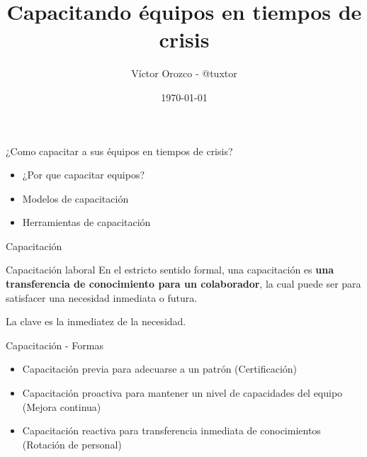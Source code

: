 \documentclass[aspectratio=169]{beamer}
\title{Capacitando équipos en tiempos de crisis}
\author{Víctor Orozco - @tuxtor}
\institute{Academik}
\date{\today}
\begin{document}
{
    \frame{\titlepage}
}

\begin{frame}[fragile]{¿Como capacitar a sus équipos en tiempos de crisis?}
	\begin{itemize}
		\item ¿Por que capacitar equipos?
		\item Modelos de capacitación
		\item Herramientas de capacitación
	\end{itemize}	
\end{frame}

\begin{frame}[fragile]{Capacitación}
    
    \begin{exampleblock}{Capacitación laboral}
        En el estricto sentido formal, una capacitación es \textbf{una transferencia de conocimiento para un colaborador}, la cual puede ser para satisfacer una necesidad inmediata o futura.
        
        La clave es la inmediatez de la necesidad.
    \end{exampleblock}
    
    

\end{frame}

\begin{frame}[fragile]{Capacitación - Formas}
    \begin{itemize}
        \item Capacitación previa para adecuarse a un patrón (Certificación)
        \item Capacitación proactiva para mantener un nivel de capacidades del equipo (Mejora continua)
        \item Capacitación reactiva para transferencia inmediata de conocimientos (Rotación de personal)
    \end{itemize}
\end{frame}
\end{document}
